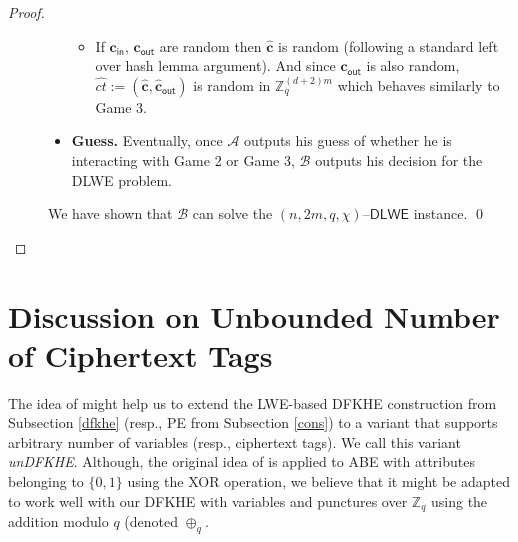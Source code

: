 \documentclass[runningheads,10pt]{llncs}
\begin{document}
\begin{proof}
\begin{description}
\begin{itemize}
\begin{itemize}
				\item If $\textbf{c}_{\textsf{in}}$, $ \textbf{c}_{\textsf{out}}$ are random then $\widehat{\textbf{c}}$ is random (following a standard left over hash lemma argument). And since $\widehat{\textbf{c}}_{\textsf{out}}$ is also random, $\widehat{ct}:=(\widehat{\textbf{c}}, \widehat{\textbf{c}}_{\textsf{out}})$ is random in $\mathbb{Z}_q^{(d+2)m}$ which behaves similarly to Game 3.
			\end{itemize}
			\item \textbf{Guess.} Eventually, once $\mathcal{A}$ outputs his guess of whether he is interacting with Game 2 or Game 3, $\mathcal{B}$ outputs his decision for the DLWE problem.  
			
		\end{itemize}
		We have shown that $\mathcal{B}$ can solve the $(n,2m,q,\chi)$--$\textsf{DLWE}$ instance. \qed

		
	\end{description}
\end{proof}



\fi




\section{Discussion on Unbounded Number of Ciphertext Tags} \label{unbounded} 
The  idea of   \cite{BV16}   might help us to extend the LWE-based DFKHE construction from Subsection \ref{dfkhe} 
(resp.,  PE from Subsection \ref{cons}) to a variant   
that supports arbitrary number of variables (resp., ciphertext tags). We call this variant \textit{\textsf{unDFKHE}}. 
Although, the original idea of \cite{BV16} is applied to ABE with attributes belonging to $\{0,1\}$ using the XOR operation, we believe that it might be adapted to work well with our DFKHE with variables and punctures over $\mathbb{Z}_q$ using the addition modulo $q$ (denoted $\oplus_q$. %
\end{document}
